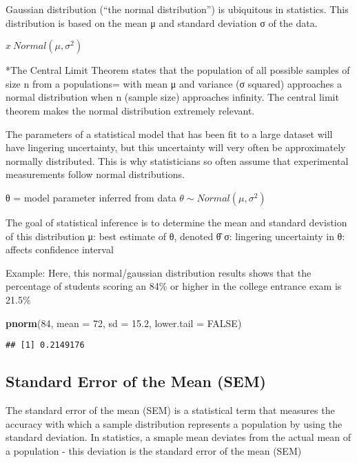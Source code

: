 \documentclass[]{article}
\newenvironment{Shaded}{\begin{snugshade}}{\end{snugshade}}
\newcommand{\DataTypeTok}[1]{\textcolor[rgb]{0.13,0.29,0.53}{#1}}
\newcommand{\DecValTok}[1]{\textcolor[rgb]{0.00,0.00,0.81}{#1}}
\newcommand{\FloatTok}[1]{\textcolor[rgb]{0.00,0.00,0.81}{#1}}
\newcommand{\KeywordTok}[1]{\textcolor[rgb]{0.13,0.29,0.53}{\textbf{#1}}}
\newcommand{\NormalTok}[1]{#1}
\newcommand{\OtherTok}[1]{\textcolor[rgb]{0.56,0.35,0.01}{#1}}
\begin{document}
Gaussian distribution (``the normal distribution'') is ubiquitous in
statistics. This distribution is based on the mean μ and standard
deviation σ of the data.

\(x~Normal(μ, σ^2)\)

*The Central Limit Theorem states that the population of all possible
samples of size n from a populations= with mean μ and variance (σ
squared) approaches a normal distribution when n (sample size)
approaches infinity. The central limit theorem makes the normal
distribution extremely relevant.

The parameters of a statistical model that has been fit to a large
dataset will have lingering uncertainty, but this uncertainty will very
often be approximately normally distributed. This is why statisticians
so often assume that experimental measurements follow normal
distributions.

θ = model parameter inferred from data \(θ∼Normal(μ,σ^2)\)

The goal of statistical inference is to determine the mean and standard
devistion of this distribution μ: best estimate of θ, denoted θ̂ σ:
lingering uncertainty in θ: affects confidence interval

Example: Here, this normal/gaussian distribution results shows that the
percentage of students scoring an 84\% or higher in the college entrance
exam is 21.5\%

\begin{Shaded}
\begin{Highlighting}[]
\KeywordTok{pnorm}\NormalTok{(}\DecValTok{84}\NormalTok{, }\DataTypeTok{mean =} \DecValTok{72}\NormalTok{, }\DataTypeTok{sd =} \FloatTok{15.2}\NormalTok{, }\DataTypeTok{lower.tail =} \OtherTok{FALSE}\NormalTok{)}
\end{Highlighting}
\end{Shaded}

\begin{verbatim}
## [1] 0.2149176
\end{verbatim}

\hypertarget{standard-error-of-the-mean-sem}{%
\subsection{Standard Error of the Mean
(SEM)}\label{standard-error-of-the-mean-sem}}

The standard error of the mean (SEM) is a statistical term that measures
the accuracy with which a sample distribution represents a population by
using the standard deviation. In statistics, a smaple mean deviates from
the actual mean of a population - this deviation is the standard error
of the mean (SEM)
\end{document}
